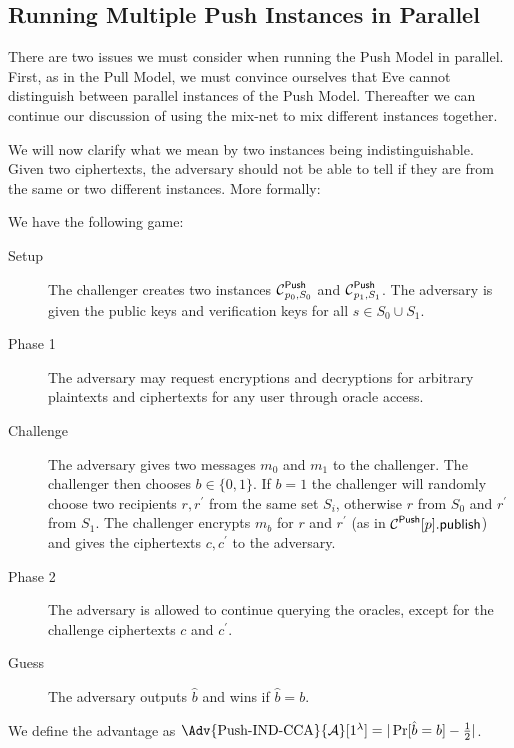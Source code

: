 \subsection{Running Multiple Push Instances in Parallel}
\label{ParallelPush}

There are two issues we must consider when running the Push Model in parallel.
First, as in the Pull Model, we must convince ourselves that Eve cannot 
distinguish between parallel instances of the Push Model.
Thereafter we can continue our discussion of using the mix-net to mix different
instances together.

We will now clarify what we mean by two instances being indistinguishable.
Given two ciphertexts, the adversary should not be able to tell if they are 
from the same or two different instances.
More formally:

\begin{definition}
  We have the following game:
  \begin{description}
    \item[Setup] The challenger creates two instances \(\Push[p_0, S_0]\) and 
      \(\Push[p_1, S_1]\).
      The adversary is given the public keys and verification keys for all 
      \(s\in S_0\cup S_1\).

    \item[Phase 1] The adversary may request encryptions and decryptions for 
      arbitrary plaintexts and ciphertexts for any user through oracle access.

    \item[Challenge] The adversary gives two messages \(m_0\) and \(m_1\) to 
      the challenger.
      The challenger then chooses \(b\in \{0, 1\}\).
      If \(b = 1\) the challenger will randomly choose two recipients \(r, 
        r^\prime\) from the same set \(S_i\), otherwise \(r\) from \(S_0\) and 
      \(r^\prime\) from \(S_1\).
      The challenger encrypts \(m_b\) for \(r\) and \(r^\prime\) (as in 
      \(\pnpub{p}\)) and gives the ciphertexts \(c, c^\prime\) to the 
      adversary.

    \item[Phase 2] The adversary is allowed to continue querying the oracles, 
      except for the challenge ciphertexts \(c\) and \(c^\prime\).

    \item[Guess] The adversary outputs \(\hat{b}\) and wins if \(\hat{b} = b\).
  \end{description}
  We define the advantage as \(\Adv{\text{Push-IND-CCA}}{\A}[1^\lambda] 
    = |\Pr[\hat{b} = b] - \frac{1}{2}|\).
\end{definition}

